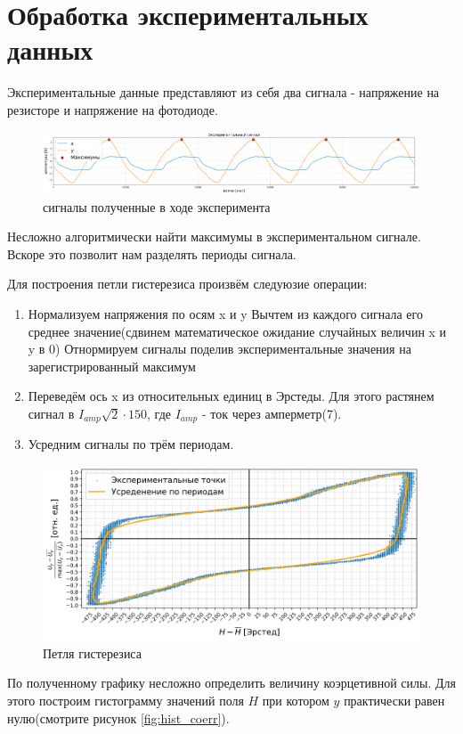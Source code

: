 \documentclass[a4paper, 12pt]{extarticle}
\begin{document}
\section*{\textcolor{header}{Обработка экспериментальных данных}}

Экспериментальные данные представляют из себя два сигнала - напряжение на резисторе и напряжение на фотодиоде.
\begin{figure}[htbp]
    \centering
    \includegraphics[width = 1\textwidth]{raw_signals.png}
    \caption{сигналы полученные в ходе эксперимента}
    \label{fig:raw_signals}
\end{figure}

Несложно алгоритмически найти максимумы в экспериментальном сигнале.
Вскоре это позволит нам разделять периоды сигнала.

Для построения петли гистерезиса произвём следуюзие операции:
\begin{enumerate}
    \item Нормализуем напряжения по осям x и y
        \subitem Вычтем из каждого сигнала его среднее значение(сдвинем математическое ожидание случайных величин x и y в 0)
        \subitem Отнормируем сигналы поделив экспериментальные значения на зарегистрированный максимум 
    \item Переведём ось x из относительных единиц в Эрстеды. Для этого растянем сигнал в $I_{amp} \sqrt{2} \cdot 150$, где $I_{amp}$ - ток через амперметр(7).
    \item Усредним сигналы по трём периодам.
\end{enumerate}

\begin{figure}[htbp]
    \centering
    \includegraphics[width = 1 \textwidth]{main.png}
    \caption{Петля гистерезиса}
    \label{fig:main}
\end{figure}
По полученному графику несложно определить величину коэрцетивной силы. Для этого построим гистограмму
значений поля $H$ при котором $y$ практически равен нулю(смотрите рисунок \ref{fig:hist_coerr}).
\end{document}
